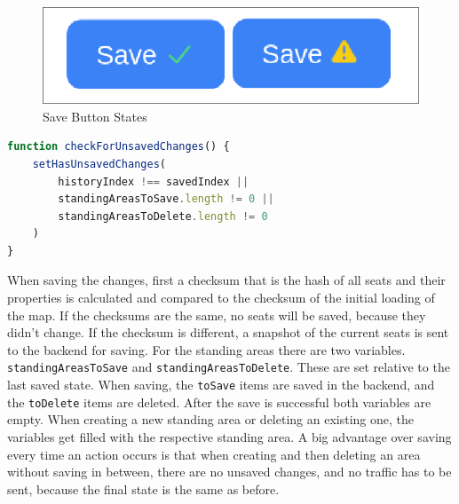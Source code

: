 \begin{figure}[H]
    \centering
    \includegraphics[scale=0.4]{pics/save-button-states.png}
    \caption{Save Button States}
    \label{fig:save-button-states}
\end{figure}

\begin{lstlisting}[language=TypeScript, caption=Check for Unsaved Changes, label=lst:check-unsaved-changes]
function checkForUnsavedChanges() {
    setHasUnsavedChanges(
        historyIndex !== savedIndex ||
        standingAreasToSave.length != 0 ||
        standingAreasToDelete.length != 0
    )
}
\end{lstlisting}

When saving the changes, first a checksum that is the hash of all seats and their properties is calculated and compared to the checksum of the initial loading of the map. If the checksums are the same, no seats will be saved, because they didn't change. If the checksum is different, a snapshot of the current seats is sent to the backend for saving. For the standing areas there are two variables. \texttt{standingAreasToSave} and \texttt{standingAreasToDelete}. These are set relative to the last saved state. When saving, the \texttt{toSave} items are saved in the backend, and the \texttt{toDelete} items are deleted. After the save is successful both variables are empty. When creating a new standing area or deleting an existing one, the variables get filled with the respective standing area. A big advantage over saving every time an action occurs is that when creating and then deleting an area without saving in between, there are no unsaved changes, and no traffic has to be sent, because the final state is the same as before.
